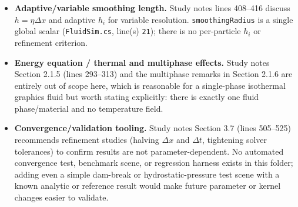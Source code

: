 \documentclass[11pt]{article}
\newcommand{\file}[1]{\texttt{#1}}
\newcommand{\loc}[2]{\texttt{#1}, line(s) \texttt{#2}}
\begin{document}
\begin{itemize}
    \texttt{interactionInputRadius} are declared in
    \file{FluidSim.compute}:44--53 but never read. If interactive
    mouse/controller forcing or a soft edge-repulsion force is desired (both
    common in SPH demos, including presumably a 2D counterpart to this
    project), the shader-side uniforms already exist and only need a kernel
    that consumes them plus CPU-side code to populate them per frame.
    \item \textbf{Adaptive/variable smoothing length.} Study notes lines
    408--416 discuss $h=\eta\Delta x$ and adaptive $h_i$ for variable
    resolution. \texttt{smoothingRadius} is a single global scalar
    (\loc{FluidSim.cs}{21}); there is no per-particle $h_i$ or refinement
    criterion.
    \item \textbf{Energy equation / thermal and multiphase effects.} Study
    notes Section 2.1.5 (lines 293--313) and the multiphase remarks in
    Section 2.1.6 are entirely out of scope here, which is reasonable for a
    single-phase isothermal graphics fluid but worth stating explicitly:
    there is exactly one fluid phase/material and no temperature field.
    \item \textbf{Convergence/validation tooling.} Study notes Section 3.7
    (lines 505--525) recommends refinement studies (halving $\Delta x$ and
    $\Delta t$, tightening solver tolerances) to confirm results are not
    parameter-dependent. No automated convergence test, benchmark scene, or
    regression harness exists in this folder; adding even a simple
    dam-break or hydrostatic-pressure test scene with a known analytic or
    reference result would make future parameter or kernel changes easier to
    validate.
\end{itemize}
\end{document}
